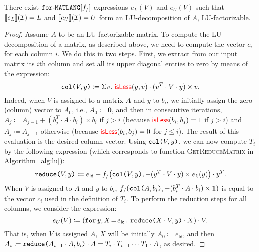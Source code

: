 \begin{proposition}\label{prop:gauss}
There exist $\langforf{f_/}$ expressions $e_L(V)$ and $e_U(V)$ such that
$\sem{e_L}{\I}=L$ and $\sem{e_U}{\I}=U$ form an LU-decomposition of $A$,
 LU-factorizable.
\end{proposition}
\begin{proof}
Assume $A$ to be an LU-factorizable matrix. To compute the LU decomposition of a matrix, as described above, we need to compute the vector $c_i$ for each column $i$. We do this in two steps. First, we extract from our input matrix its $i$th column and set all its upper diagonal entries to zero
by means of 
 the 
 expression:
$$\ccol{V}{y} \coloneqq   \Sigma v. \  \EDIT{\isless}(y,v)\cdot(v^T\cdot V \cdot y)\times v.$$
Indeed, when $V$ is assigned to a matrix $A$ and $y$ to $b_i$, we initially assign the zero (column) vector to $A_0$, i.e., 
$A_0\coloneqq  \mathbf{0}$, and then in consecutive iterations,  $A_j\coloneqq  A_{j-1}+ (b_j^T\cdot A\cdot b_i)\times b_i$ if $j>i$ (because $\EDIT{\isless}(b_i,b_j)=1$ if $j>i$) and $A_j\coloneqq A_{j-1}$ otherwise (because $\EDIT{\isless}(b_i,b_j)=0$ for $j\leq i$). The result of this evaluation is the desired column vector.
Using $\ccol{V}{y}$, we can now compute $T_i$ by the following expression (which corresponds to function \textsc{GetReduceMatrix} in Algorithm~\ref{alg:lu}):
$$\red{V}{y} \coloneqq   e_{\mathsf{Id}}+ f_/\bigl(\ccol{V}{y},-(y^T\cdot V\cdot y)\times e_{\ones}(y)\bigr)\cdot y^T.$$
When $V$ is assigned to $A$ and $y$ to $b_i$, $f_/(\ccol{A}{b_i},-(b_i^T\cdot A\cdot b_i)\times \ones)$ is equal to the vector $c_i$ used in the definition of $T_i$. To perform the reduction steps for all columns, we consider
the expression:
$$
e_{U}(V) \coloneqq    \left( \initf{e_{\mathsf{Id}}}{y}{X}{\red{X\cdot V}{y}\cdot X} \right) \cdot V.
$$
That is, when $V$ is assigned $A$, $X$ will be initially $A_0\coloneqq  e_{\mathsf{Id}}$, and then
$A_i\coloneqq  \red{A_{i-1}\cdot A}{b_i}\cdot A=T_i\cdot T_{i-1}\cdots T_1\cdot A$, as desired.


\end{proof}
